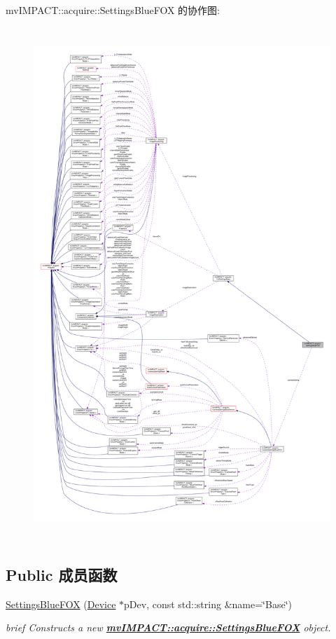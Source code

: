 mv\+I\+M\+P\+A\+C\+T\+:\+:acquire\+:\+:Settings\+Blue\+F\+O\+X 的协作图\+:
\nopagebreak
\begin{figure}[H]
\begin{center}
\leavevmode
\includegraphics[height=550pt]{classmv_i_m_p_a_c_t_1_1acquire_1_1_settings_blue_f_o_x__coll__graph}
\end{center}
\end{figure}
\subsection*{Public 成员函数}
\begin{DoxyCompactItemize}
\item 
\hyperlink{classmv_i_m_p_a_c_t_1_1acquire_1_1_settings_blue_f_o_x_af5ce2798de3777df14c57de81f3a2b02}{Settings\+Blue\+F\+O\+X} (\hyperlink{classmv_i_m_p_a_c_t_1_1acquire_1_1_device}{Device} $\ast$p\+Dev, const std\+::string \&name=\char`\"{}Base\char`\"{})
\begin{DoxyCompactList}\small\item\em brief Constructs a new {\bfseries \hyperlink{classmv_i_m_p_a_c_t_1_1acquire_1_1_settings_blue_f_o_x}{mv\+I\+M\+P\+A\+C\+T\+::acquire\+::\+Settings\+Blue\+F\+O\+X}} object. \end{DoxyCompactList}\end{DoxyCompactItemize}
